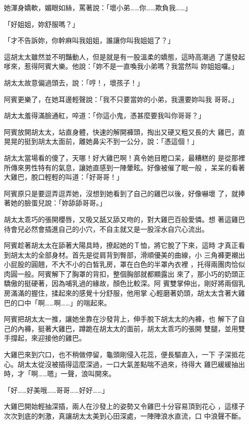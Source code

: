 她渾身嬌軟，媚眼如絲，罵著說：「壞小弟……你……欺負我……」

「好姐姐，妳舒服嗎？」

「才不告訴妳，你幹麻叫我姐姐，誰讓你叫我姐姐了？」

這胡太太雖然並不明豔動人，但是就是有一股溫柔的嬌態，這時高潮過
了還發起嗲來，惹得阿賓大樂。他說：「妳不是一直喚我小弟嗎？我當然叫
妳姐姐囉。」

胡太太故意偏過頭去，說：「哼！，壞孩子！」

阿賓更樂了，在她耳邊輕聲說：「我不只要當妳的小弟，我還要妳叫我
哥哥。」

胡太太羞得滿臉通紅，啐道：「你這小鬼，憑甚麼要我叫你哥哥？」

阿賓放開胡太太，站直身體，快速的解開褲頭，掏出又硬又粗又長的大
雞巴，直晃晃的挺到胡太太面前，離她鼻尖不到一公分，說：「憑這個！」

胡太太當場看的傻了，天哪！好大雞巴啊！真令她目瞪口呆，最糟糕的
是從那裡所傳來男性特有的氣息，讓她直感到一陣暈眩。好像被催了眠一般
，呆呆的看著大雞巴，脫口輕輕的叫道：「好哥哥！」

阿賓原只是要逗弄逗弄她，沒想到她看到了自己的雞巴以後，好像嚇壞
了，就捧著她的臉蛋兒說：「妳舔舔哥哥。」

胡太太乖巧的張開櫻唇，又吸又舐又舔又吻的，對大雞巴百般愛憐。想
著這雞巴待會兒必然會插進自己的小穴，不自主就又是一股淫水自穴心流出。

阿賓趁著胡太太在舔著大陽具時，撩起她的Ｔ恤，將它脫了下來，這時
才真正看到胡太太的全部身材。首先是從肩背到臀部，滑順優美的曲線，小
三角褲更襯出小屁股的圓翹，不大不小的白皙乳房，罩在白色的半罩內衣裡
，托得兩團肉恰似肉圓一般。阿賓解下了胸罩的背扣，整個胸部就都顯露出
來了，那小巧的奶頭正驕傲的挺硬著，因為哺乳過的緣故，顏色比較深。阿
賓雙掌伸出，剛好將兩個乳房滿滿的握住，揉起來的感覺十分舒服，他用掌
心輕磨著奶頭，胡太太含著大雞巴的口中「啊……啊……」的喘起來。

阿賓把胡太太一推，讓她坐靠在沙發背上，伸手脫下胡太太的內褲，也
解下了自己的內褲，挺著大雞巴，蹲跪在胡太太的面前，胡太太乖巧的張開
雙腿，並用雙手撐起，來迎接他的雞巴。

大雞巴來到穴口，也不稍做停留，龜頭剛侵入花蕊，便長驅直入，一下
子深抵花心。胡太太從沒被插得這麼深過，一口大氣差點喘不過來，待得大
雞巴緩緩抽出時，才「啊……嗯」一聲，浪叫開來。

「好……好美哦……哥哥……好好……」

大雞巴開始輕抽深插，兩人在沙發上的姿勢又令雞巴十分容易頂到花心
，這樣子次次到底的刺激，真讓胡太太美到心田深處，一陣陣浪水直流，口
中浪聲不斷。

